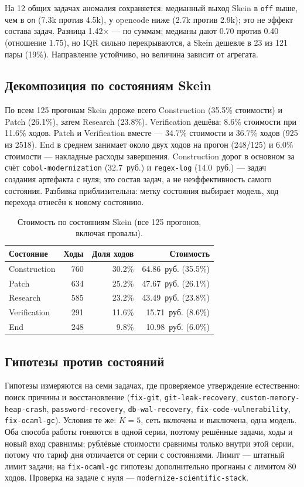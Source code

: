 \documentclass[11pt,a4paper]{article}
\begin{document}
На 12 общих задачах аномалия сохраняется: медианный выход Skein в \texttt{off} выше, чем в
\texttt{on} (7.3k против 4.5k), у opencode ниже (2.7k против 2.9k); это не эффект состава
задач. Разница 1.42$\times$ --- по суммам; медианы дают 0.70 против 0.40 (отношение 1.75),
но IQR сильно перекрываются, а Skein дешевле в 23 из 121 пары (19\%). Направление устойчиво,
но величина зависит от агрегата.

\subsection{Декомпозиция по состояниям Skein}

По всем 125 прогонам Skein дороже всего Construction (35.5\% стоимости) и Patch (26.1\%),
затем Research (23.8\%). Verification дешёва: 8.6\% стоимости при 11.6\% ходов. Patch и
Verification вместе --- 34.7\% стоимости и 36.7\% ходов (925 из 2518). End в среднем
занимает около двух ходов на прогон (248/125) и 6.0\% стоимости --- накладные расходы
завершения. Construction дорог в основном за счёт \texttt{cobol-modernization} (32.7~руб.)
и \texttt{regex-log} (14.0~руб.) --- задач создания артефакта с нуля; это состав задач, а не
неэффективность самого состояния. Разбивка приблизительна: метку состояния выбирает модель, ход перехода
отнесён к новому состоянию.

\begin{table}[t]
\centering
\small
\caption{Стоимость по состояниям Skein (все 125 прогонов, включая провалы).}
\label{tab:state}
\begin{tabular}{@{}lrrr@{}}
\toprule
Состояние & Ходы & Доля ходов & Стоимость \\
\midrule
Construction & 760 & 30.2\% & 64.86~руб. (35.5\%) \\
Patch & 634 & 25.2\% & 47.67~руб. (26.1\%) \\
Research & 585 & 23.2\% & 43.49~руб. (23.8\%) \\
Verification & 291 & 11.6\% & 15.71~руб. (8.6\%) \\
End & 248 & 9.8\% & 10.98~руб. (6.0\%) \\
\bottomrule
\end{tabular}
\end{table}


\subsection{Гипотезы против состояний}
\label{sec:hyp-exp}

Гипотезы измеряются на семи задачах, где проверяемое утверждение естественно: поиск причины и
восстановление (\texttt{fix-git}, \texttt{git-leak-recovery},
\texttt{custom-memory-heap-crash}, \texttt{password-recovery}, \texttt{db-wal-recovery},
\texttt{fix-code-vulnerability}, \texttt{fix-ocaml-gc}). Условия те же: $K=5$, сеть включена и
выключена, одна модель. Оба способа работы гоняются в одной серии, поэтому решённые задачи,
ходы и новый вход сравнимы; рублёвые стоимости сравнимы только внутри этой серии, потому что
тариф дня отличается от серии с состояниями. Лимит --- штатный лимит задачи; на
\texttt{fix-ocaml-gc} гипотезы дополнительно прогнаны с лимитом 80 ходов. Проверка на задаче
с нуля --- \texttt{modernize-scientific-stack}.
\end{document}
